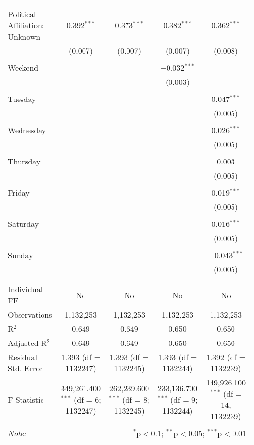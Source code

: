 \documentclass[
]{article}
\begin{document}
\begin{table}[!htbp]
{\begin{tabular}{@{\extracolsep{5pt}}lcccc}
  & & & & \\ 
 Political Affiliation: Unknown & 0.392$^{***}$ & 0.373$^{***}$ & 0.382$^{***}$ & 0.362$^{***}$ \\ 
  & (0.007) & (0.007) & (0.007) & (0.008) \\ 
  & & & & \\ 
 Weekend &  &  & $-$0.032$^{***}$ &  \\ 
  &  &  & (0.003) &  \\ 
  & & & & \\ 
 Tuesday &  &  &  & 0.047$^{***}$ \\ 
  &  &  &  & (0.005) \\ 
  & & & & \\ 
 Wednesday &  &  &  & 0.026$^{***}$ \\ 
  &  &  &  & (0.005) \\ 
  & & & & \\ 
 Thursday &  &  &  & 0.003 \\ 
  &  &  &  & (0.005) \\ 
  & & & & \\ 
 Friday &  &  &  & 0.019$^{***}$ \\ 
  &  &  &  & (0.005) \\ 
  & & & & \\ 
 Saturday &  &  &  & 0.016$^{***}$ \\ 
  &  &  &  & (0.005) \\ 
  & & & & \\ 
 Sunday &  &  &  & $-$0.043$^{***}$ \\ 
  &  &  &  & (0.005) \\ 
  & & & & \\ 
\hline \\[-1.8ex] 
Individual FE & No & No & No & No \\ 
Observations & 1,132,253 & 1,132,253 & 1,132,253 & 1,132,253 \\ 
R$^{2}$ & 0.649 & 0.649 & 0.650 & 0.650 \\ 
Adjusted R$^{2}$ & 0.649 & 0.649 & 0.650 & 0.650 \\ 
Residual Std. Error & 1.393 (df = 1132247) & 1.393 (df = 1132245) & 1.393 (df = 1132244) & 1.392 (df = 1132239) \\ 
F Statistic & 349,261.400$^{***}$ (df = 6; 1132247) & 262,239.600$^{***}$ (df = 8; 1132245) & 233,136.700$^{***}$ (df = 9; 1132244) & 149,926.100$^{***}$ (df = 14; 1132239) \\ 
\hline 
\hline \\[-1.8ex] 
\textit{Note:}  & \multicolumn{4}{r}{$^{*}$p$<$0.1; $^{**}$p$<$0.05; $^{***}$p$<$0.01} \\ 
\end{tabular}
} 
\end{table} 
\newpage
\end{document}
